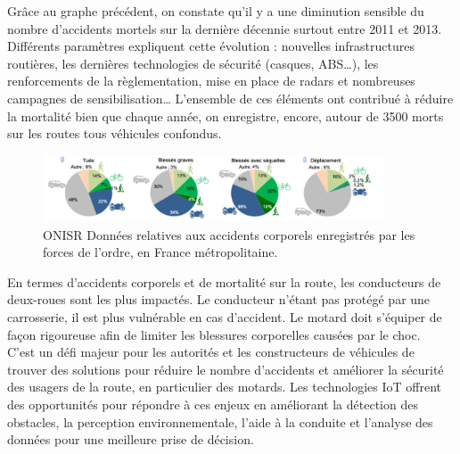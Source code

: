 Grâce au graphe précédent, on constate qu’il y a une diminution sensible du nombre d’accidents mortels sur la dernière décennie surtout entre 2011 et 2013. Différents paramètres expliquent cette évolution : nouvelles infrastructures routières, les dernières technologies de sécurité (casques, ABS…), les renforcements de la règlementation, mise en place de radars et nombreuses campagnes de sensibilisation… L’ensemble de ces éléments ont contribué à réduire la mortalité bien que chaque année, on enregistre, encore, autour de 3500 morts sur les routes tous véhicules confondus. 

\begin{figure}[h]
    \centering
    \includegraphics[width=0.9\textwidth]{images/camambert_accidents_differents_vehicules.png} 
    \caption{ONISR Données relatives aux accidents corporels enregistrés par les forces de l'ordre, en France métropolitaine.}
\end{figure}

En termes d’accidents corporels et de mortalité sur la route, les conducteurs de deux-roues sont les plus impactés. Le conducteur n’étant pas protégé par une carrosserie, il est plus vulnérable en cas d’accident. Le motard doit s’équiper de façon rigoureuse afin de limiter les blessures corporelles causées par le choc.\\
C'est un défi majeur pour les autorités et les constructeurs de véhicules de trouver des solutions pour réduire le nombre d'accidents et améliorer la sécurité des usagers de la route, en particulier des motards. Les technologies IoT offrent des opportunités pour répondre à ces enjeux en améliorant la détection des obstacles, la perception environnementale, l'aide à la conduite et l'analyse des données pour une meilleure prise de décision.\\


